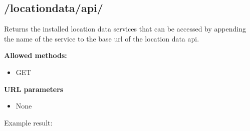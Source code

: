 \documentclass[letterpaper,10pt,english]{sphinxmanual}
\begin{document}
\subsection{/locationdata/api/}
\label{restdoc:locationdata-api}
Returns the installed location data services that can be accessed by appending the name of the service to the base url of
the location data api.

\textbf{Allowed methods:}
\begin{itemize}
\item {} 
GET

\end{itemize}

\textbf{URL parameters}
\begin{itemize}
\item {} 
None

\end{itemize}

Example result:
\end{document}
